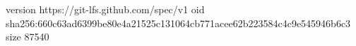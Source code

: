 version https://git-lfs.github.com/spec/v1
oid sha256:660c63ad6399be80e4a21525c131064cb771acee62b223584c4c9e545946b6c3
size 87540
